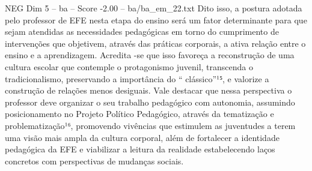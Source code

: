 \begin{textsample}{NEG Dim 5 – ba – Score -2.00 – ba/ba\_em\_22.txt}
Dito isso, a postura adotada pelo professor de EFE nesta etapa do ensino será um fator determinante para que sejam atendidas as necessidades pedagógicas em torno do cumprimento de intervenções que objetivem, através das práticas corporais, a ativa relação entre o ensino e a aprendizagem.
Acredita -se que isso favoreça a reconstrução de uma cultura escolar que contemple o protagonismo juvenil, transcenda o tradicionalismo, preservando a importância do “ clássico”¹⁵, e valorize a construção de relações menos desiguais.
Vale destacar que nessa perspectiva o professor deve organizar o seu trabalho pedagógico com autonomia, assumindo posicionamento no Projeto Político Pedagógico, através da tematização e problematização¹⁶, promovendo vivências que estimulem as juventudes a terem uma visão mais ampla da cultura corporal, além de fortalecer a identidade pedagógica da EFE e viabilizar a leitura da realidade estabelecendo laços concretos com perspectivas de mudanças sociais.

\end{textsample}
